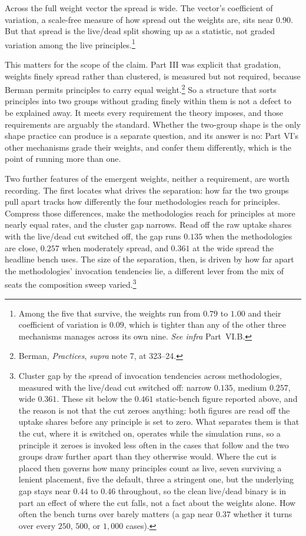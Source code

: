 Across the full weight vector the spread is wide. The vector's coefficient of
variation, a scale-free measure of how spread out the weights are, sits near $0.90$. But that spread is the live/dead split showing up as a
statistic, not graded variation among the live principles.\footnote{Among the
five that survive, the weights run from $0.79$ to $1.00$ and their coefficient
of variation is $0.09$, which is tighter than any of the other three
mechanisms manages across its own nine. \textit{See infra} Part~VI.B.}

This matters for the scope of the claim. Part III
was explicit that gradation, weights finely spread rather than
clustered, is measured but not required, because Berman permits
principles to carry equal weight.\footnote{Berman, \textit{Practices},
\textit{supra} note 7, at 323--24.} So a structure that sorts principles
into two groups without grading finely within them is not a defect to be
explained away. It meets every requirement the theory imposes, and those requirements are
arguably the standard. Whether the two-group shape is the only
shape practice can produce is a separate question, and its answer is no:
Part VI's other mechanisms grade their weights, and confer them
differently, which is the point of running more than one.

Two further features of the emergent weights, neither a requirement, are
worth recording. The first locates what drives the separation: how far the two
groups pull apart tracks how differently the four
methodologies reach for principles. Compress those differences, make the
methodologies reach for principles at more nearly equal rates, and the cluster gap narrows. Read off the raw uptake shares with the live/dead cut
switched off, the gap runs $0.135$ when the methodologies are close, $0.257$
when moderately spread, and $0.361$ at the wide spread the headline bench
uses. The size of the separation, then, is driven by how far apart the
methodologies' invocation tendencies lie, a different lever from the mix of
seats the composition sweep varied.\footnote{Cluster gap by the spread of
invocation tendencies across methodologies, measured with the live/dead cut
switched off: narrow $0.135$, medium $0.257$, wide $0.361$. These sit below the $0.461$ static-bench figure reported above, and the reason
is not that the cut zeroes anything: both figures are read off the uptake
shares before any principle is set to zero. What separates them is that the
cut, where it is switched on, operates while the simulation runs, so a
principle it zeroes is invoked less often in the cases that follow and the two
groups draw further apart than they otherwise would. Where the cut is placed
then governs how many principles count as live, seven surviving a lenient
placement, five the default, three a stringent one, but the underlying gap
stays near $0.44$ to $0.46$ throughout, so the clean live/dead binary is in
part an effect of where the cut falls, not a fact about the weights alone. How often the
bench turns over barely matters (a gap near $0.37$ whether it turns over
every $250$, $500$, or $1{,}000$ cases).}

